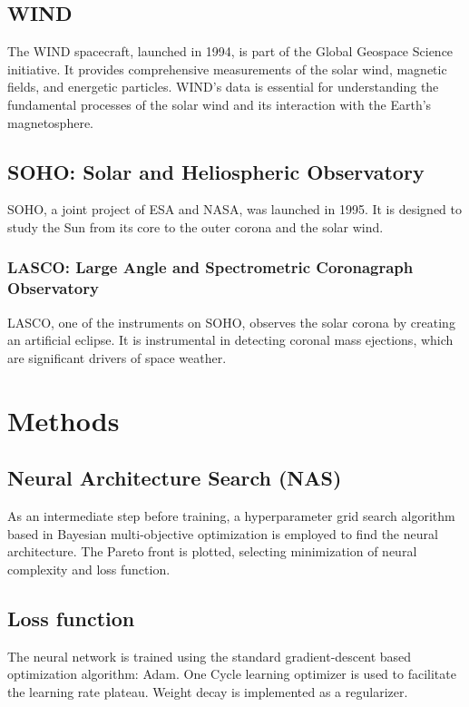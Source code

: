 \documentclass[12pt]{article}
\begin{document}
\subsection{WIND}
The WIND spacecraft, launched in 1994, is part of the Global Geospace Science initiative. It provides comprehensive measurements of the solar wind, magnetic fields, and energetic particles. WIND's data is essential for understanding the fundamental processes of the solar wind and its interaction with the Earth's magnetosphere.

\subsection{SOHO: Solar and Heliospheric Observatory}
SOHO, a joint project of ESA and NASA, was launched in 1995. It is designed to study the Sun from its core to the outer corona and the solar wind.

\subsubsection{LASCO: Large Angle and Spectrometric Coronagraph Observatory}
LASCO, one of the instruments on SOHO, observes the solar corona by creating an artificial eclipse. It is instrumental in detecting coronal mass ejections, which are significant drivers of space weather.

\section{Methods}

\subsection{Neural Architecture Search (NAS)}
As an intermediate step before training, a hyperparameter grid search algorithm based in Bayesian multi-objective optimization is employed to find the neural architecture. The Pareto front is plotted, selecting minimization of neural complexity and loss function.

\subsection{Loss function}
The neural network is trained using the standard gradient-descent based optimization algorithm: Adam. One Cycle learning optimizer is used to facilitate the learning rate plateau. Weight decay is implemented as a regularizer.
\end{document}
